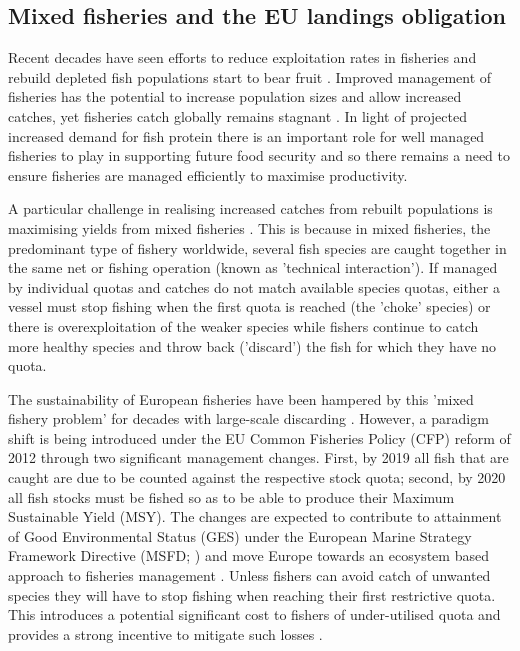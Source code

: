 \documentclass{nature}
\begin{document}
\begin{linenumbers}
\begin{abstract}
[296 words]

\end{abstract}

\section*{}

\subsection{Mixed fisheries and the EU landings obligation} 

Recent decades have seen efforts to reduce exploitation rates in fisheries and
rebuild depleted fish populations start to bear fruit \cite{Worm2009}.
Improved management of fisheries has the potential to increase population sizes
and allow increased catches, yet fisheries catch globally remains stagnant
\cite{FAO2016}.  In light of projected increased demand for fish protein
\cite{B??n??2016} there is an important role for well managed fisheries to play
in supporting future food security \cite{Mcclanahan2015} and so there remains a
need to ensure fisheries are managed efficiently to maximise productivity.

A particular challenge in realising increased catches from rebuilt populations
is maximising yields from mixed fisheries \cite{Branch2008, Kuriyama2016,
	Ulrich2016}. This is because in mixed fisheries, the predominant type
of fishery worldwide, several fish species are caught together in the same net
or fishing operation (known as 'technical interaction'). If managed by
individual quotas and catches do not match available species quotas, either a
vessel must stop fishing when the first quota is reached (the 'choke' species)
or there is overexploitation of the weaker species while fishers continue to
catch more healthy species and throw back ('discard') the fish for which they
have no quota.

The sustainability of European fisheries have been hampered by this 'mixed
fishery problem' for decades with large-scale discarding \cite{Borges2015,
	Uhlmann2014}.  However, a paradigm shift is being introduced under the
EU Common Fisheries Policy (CFP) reform of 2012 through two significant
management changes.  First, by 2019 all fish that are caught are due to be
counted against the respective stock quota; second, by 2020 all fish stocks
must be fished so as to be able to produce their Maximum Sustainable Yield
(MSY)\cite{EuropeanParliamentandCounciloftheEuropeanUnion2013}. The changes are
expected to contribute to attainment of Good Environmental Status (GES) under
the European Marine Strategy Framework Directive (MSFD;
\cite{EuropeanParliament2008}) and move Europe towards an ecosystem based
approach to fisheries management \cite{Garcia2003}. Unless fishers can avoid
catch of unwanted species they will have to stop fishing when reaching their
first restrictive quota. This introduces a potential significant cost to
fishers of under-utilised quota\cite{Hoff2010a, Ulrich2016} and provides a
strong incentive to mitigate such losses \cite{Condie2013, Condie2013a}. \\


\end{linenumbers}
\end{document}
